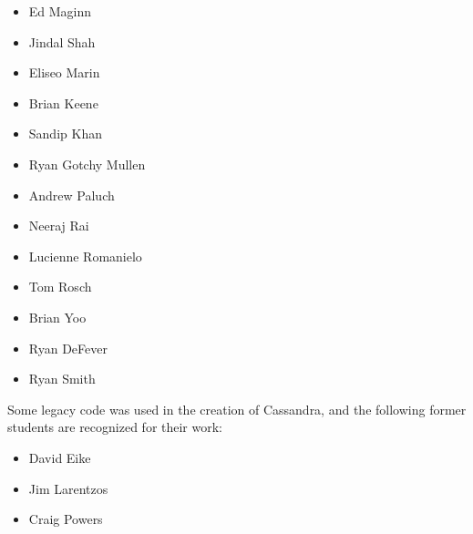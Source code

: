 \begin{itemize}

\item Ed Maginn
\item Jindal Shah
\item Eliseo Marin
\item Brian Keene
\item Sandip Khan
\item Ryan Gotchy Mullen
\item Andrew Paluch
\item Neeraj Rai
\item Lucienne Romanielo
\item Tom Rosch
\item Brian Yoo
\item Ryan DeFever
\item Ryan Smith
\end{itemize}


Some legacy code was used in the creation of Cassandra, and the following former students are recognized for their work:

\begin{itemize}
\item David Eike
\item Jim Larentzos
\item Craig Powers
\end{itemize}
